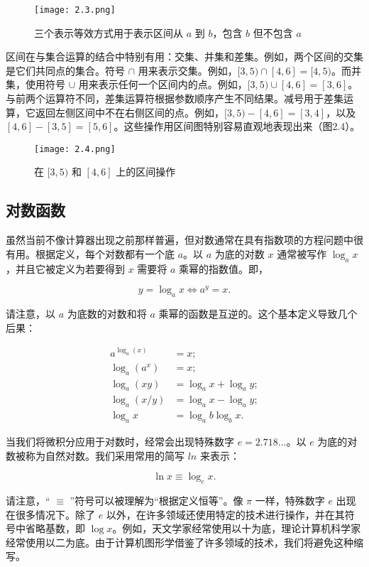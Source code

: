 \documentclass[lang=cn,10pt]{elegantbook}
\begin{document}
\begin{figure}[htbp]
\centering
\texttt{[image: 2.3.png]}
\caption{三个表示等效方式用于表示区间从 $a$ 到 $b$，包含 $b$ 但不包含 $a$}
\end{figure}

区间在与集合运算的结合中特别有用：交集、并集和差集。例如，两个区间的交集是它们共同点的集合。符号 $\cap$ 用来表示交集。例如，$[3,5) \cap [4,6] = [4,5)$。而并集，使用符号 $\cup$ 用来表示任何一个区间内的点。例如，$[3,5) \cup [4,6] = [3,6]$。与前两个运算符不同，差集运算符根据参数顺序产生不同结果。减号用于差集运算，它返回左侧区间中不在右侧区间的点。例如，$[3,5) - [4,6] = [3,4]$，以及 $[4,6] - [3,5] = [5,6]$。这些操作用区间图特别容易直观地表现出来（图2.4）。

\begin{figure}[htbp]
\centering
\texttt{[image: 2.4.png]}
\caption{在 $[3,5)$ 和 $[4,6]$ 上的区间操作}
\end{figure}

\subsection{对数函数}

虽然当前不像计算器出现之前那样普遍，但对数通常在具有指数项的方程问题中很有用。根据定义，每个对数都有一个底 $a$。以 $a$ 为底的对数 $x$ 通常被写作 $\log_ax$，并且它被定义为若要得到 $x$ 需要将 $a$ 乘幂的指数值。即，

$$y = \log_ax \iff a^y = x. $$

请注意，以 $a$ 为底数的对数和将 $a$ 乘幂的函数是互逆的。这个基本定义导致几个后果：

$$
\begin{aligned}
a^{\log_a(x)} &= x; \\
\log_a(a^x) &= x; \\
\log_a(xy) &= \log_ax+\log_ay; \\
\log_a(x/y) &= \log_ax-\log_ay; \\
\log_ax &= \log_ab\log_bx.
\end{aligned}
$$

当我们将微积分应用于对数时，经常会出现特殊数字 $e=2.718...$。以 $e$ 为底的对数被称为自然对数。我们采用常用的简写 $ln$ 来表示：

$$\ln x \equiv \log_ex.$$

请注意，“ $\equiv$ ”符号可以被理解为“根据定义恒等”。像 $\pi$ 一样，特殊数字 $e$ 出现在很多情况下。除了 $e$ 以外，在许多领域还使用特定的技术进行操作，并在其符号中省略基数，即 $\log x$。例如，天文学家经常使用以十为底，理论计算机科学家经常使用以二为底。由于计算机图形学借鉴了许多领域的技术，我们将避免这种缩写。
\end{document}
